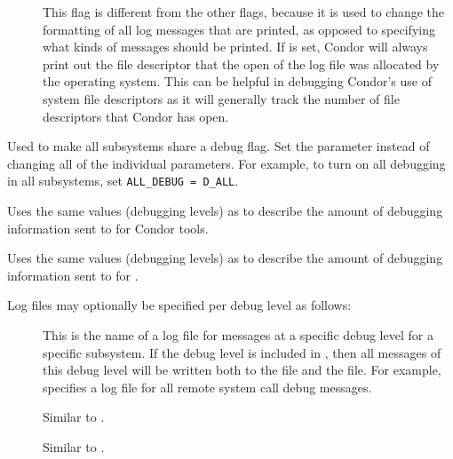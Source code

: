 \begin{description}
\begin{description}
  \item[] \label{dflag:fds}
    This flag is different from the other flags, because it is
    used to change the formatting of all log messages that are printed,
    as opposed to specifying what kinds of messages should be printed.
    If  is set, Condor will always print out the file descriptor
    that the open of the log file was allocated by the operating system.
    This can be helpful in debugging Condor's use of system file
    descriptors as it will generally track the number of file descriptors
    that Condor has open.

    
  \end{description}

\item[\Macro{ALL\_DEBUG}] \label{param:AllDebug} Used to make all subsystems
  share a debug flag. Set the parameter 
  instead of changing all of the individual parameters.  For example,
  to turn on all debugging in all subsystems, set
  \verb$ALL_DEBUG = D_ALL$.

\item[\Macro{TOOL\_DEBUG}] \label{param:ToolDebug} Uses the same
  values (debugging levels) as  to
  describe the amount of debugging information sent to  
  for Condor tools.

\item[\Macro{SUBMIT\_DEBUG}] \label{param:SubmitDebug} Uses the same
  values (debugging levels) as  to
  describe the amount of debugging information sent to  
  for .

\end{description}

Log files may optionally be specified per debug level as follows:
\begin{description}

\item[] \label{param:SubsysLevelLog} This is
  the name of a log file for messages at a specific debug level for a
  specific subsystem.  If the debug level is included in
  , then all messages of this debug level will be
  written both to the  file and the
   file.  For example,
   specifies a log file for all remote
  system call debug messages.

\item[] \label{param:MaxSubsysLevelLog}
  Similar to .

\item[]
  \label{param:TruncSubsysLevelLogOnOpen} Similar to
  .

\end{description}

